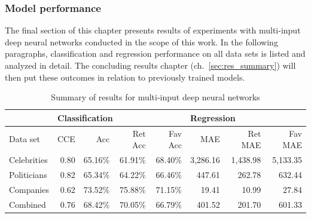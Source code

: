 \subsubsection{Model performance}
\label{sub:comb_performance}

The final section of this chapter presents results of experiments with multi-input
deep neural networks conducted in the scope of this work.
In the following paragraphs, classification and regression performance on all
data sets is listed and analyzed in detail.
The concluding results chapter (ch.~\ref{sec:res_summary}) will then put these
outcomes in relation to previously trained models.

\begin{table}
  \begin{tabular}{lrrrrrrr}
    \toprule
    & \multicolumn{4}{l}{Classification} & \multicolumn{3}{l}{Regression} \\
    \midrule
    Data set & CCE & Acc & Ret Acc & Fav Acc & MAE & Ret MAE & Fav MAE \\
    \midrule
    Celebrities & 0.80 & 65.16\% & 61.91\% & 68.40\% & 3,286.16 & 1,438.98 & 5,133.35 \\
    Politicians & 0.82 & 65.34\% & 64.22\% & 66.46\% & 447.61 & 262.78 & 632.44 \\
    Companies & 0.62 & 73.52\% & 75.88\% & 71.15\% & 19.41 & 10.99 & 27.84 \\
    Combined & 0.76 & 68.42\% & 70.05\% & 66.79\% & 401.52 & 201.70 & 601.33 \\
    \bottomrule
  \end{tabular}
  \caption{Summary of results for multi-input deep neural networks}
  \label{tab:deep2_results}
\end{table}

